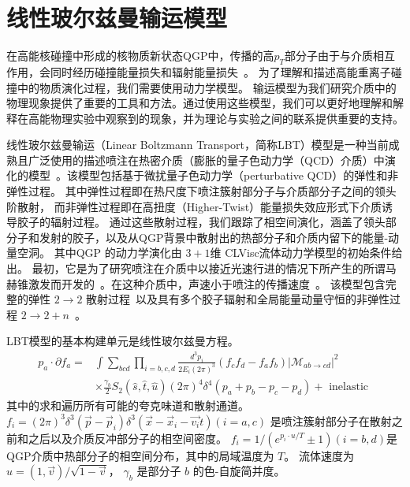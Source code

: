 \section{线性玻尔兹曼输运模型}
\label{sec:lbt}	
 
  在高能核碰撞中形成的核物质新状态QGP中，传播的高$p_T$部分子由于与介质相互作用，会同时经历碰撞能量损失和辐射能量损失~\parencite{Baier:2000mf}。
   为了理解和描述高能重离子碰撞中的物质演化过程，我们需要使用动力学模型。
  输运模型为我们研究介质中的物理现象提供了重要的工具和方法。通过使用这些模型，我们可以更好地理解和解释在高能物理实验中观察到的现象，并为理论与实验之间的联系提供重要的支持。

  线性玻尔兹曼输运（Linear Boltzmann Transport，简称LBT）模型是一种当前成熟且广泛使用的描述喷注在热密介质（膨胀的量子色动力学（QCD）介质）中演化的模型~\parencite{Nahrgang:2013saa,Scardina:2017ipo,Cao:2017hhk,Chen:2020tbl,Luo:2018pto,Yang:2022nei,He:2015pra}。该模型包括基于微扰量子色动力学（perturbative QCD）的弹性和非弹性过程。
  其中弹性过程即在热尺度下喷注簇射部分子与介质部分子之间的领头阶散射，
  而非弹性过程即在高扭度（Higher-Twist）能量损失效应形式下介质诱导胶子的辐射过程。
  通过这些散射过程，我们跟踪了相空间演化，涵盖了领头部分子和发射的胶子，以及从QGP背景中散射出的热部分子和介质内留下的能量-动量空洞。
  其中QGP 的动力学演化由 $3 + 1$维 CLVisc流体动力学模型的初始条件给出。
  最初，它是为了研究喷注在介质中以接近光速行进的情况下所产生的所谓马赫锥激发而开发的~\parencite{Li:2010ts}。在这种介质中，声速小于喷注的传播速度~\parencite{Casalderrey-Solana:2004fdk,Stoecker:2004qu,Ruppert:2005uz,Chaudhuri:2005vc}。
  该模型包含完整的弹性 $2 \to 2$ 散射过程~\parencite{Peng:2014jia}以及具有多个胶子辐射和全局能量动量守恒的非弹性过程 $2 \to 2 + n$~\parencite{Wang:2013cia,Cao:2016gvr,Luo:2016ufs}。
  
  LBT模型的基本构建单元是线性玻尔兹曼方程。
  \begin{equation}
  	\begin{aligned}
  		p_a \cdot \partial f_a= & \int \sum_{b c d} \prod_{i=b, c, d} \frac{d^3 p_i}{2 E_i(2 \pi)^3}\left(f_c f_d-f_a f_b\right)\left|\mathcal{M}_{a b \rightarrow c d}\right|^2 \\
  		& \times \frac{\gamma_b}{2} S_2(\hat{s}, \hat{t}, \hat{u})(2 \pi)^4 \delta^4\left(p_a+p_b-p_c-p_d\right)+\text { inelastic }
  	\end{aligned}
  \end{equation}
	其中的求和遍历所有可能的夸克味道和散射通道。
	$f_i=(2 \pi)^3 \delta^3\left(\vec{p}-\vec{p}_i\right) \delta^3\left(\vec{x}-\vec{x}_i-\vec{v_i}t \right) (i=a, c)$ 是喷注簇射部分子在散射之前和之后以及介质反冲部分子的相空间密度。
	$f_i=1 /\left(e^{p_i \cdot u / T} \pm 1\right)(i=b,d)$是QGP介质中热部分子的相空间分布，其中的局域温度为 $T$。
	流体速度为 $u=(1,\vec{v})/\sqrt{1-\vec{v}}$，
	$\gamma_b$ 是部分子 $b$ 的色-自旋简并度。
  
